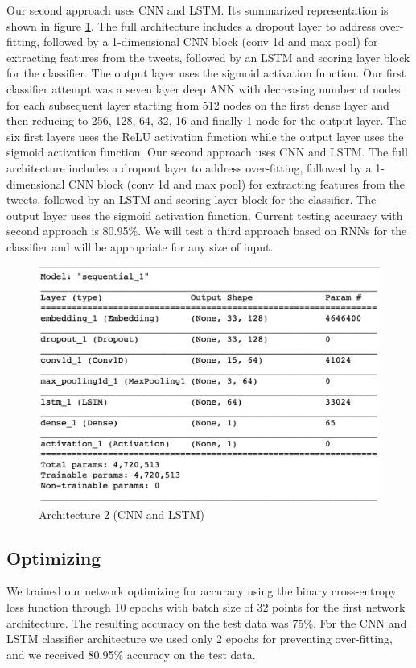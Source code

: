 \documentclass[conference]{sig-alternate-05-2015}
\begin{document}
Our second approach uses CNN and LSTM. Its summarized representation is shown in figure \ref{fig:model CNN LSTM}. The full architecture includes a dropout layer to address over-fitting, followed by a 1-dimensional CNN block (conv 1d and max pool) for extracting features from the tweets, followed by an LSTM and scoring layer block for the classifier. The output layer uses the sigmoid activation function.
Our first classifier attempt was a seven layer deep ANN with decreasing number of nodes for each subsequent layer starting from 512 nodes on the first dense layer and then reducing to 256, 128, 64, 32, 16 and finally 1 node for the output layer. The six first layers uses the ReLU activation function while the output layer uses the sigmoid activation function.
Our second approach uses CNN and LSTM. The full architecture includes a dropout layer to address over-fitting, followed by a 1-dimensional CNN block (conv 1d and max pool) for extracting features from the tweets, followed by an LSTM and scoring layer block for the classifier. The output layer uses the sigmoid activation function. Current testing accuracy with second approach is 80.95\%.
We will test a third approach based on RNNs for the classifier and will be appropriate for any size of input.
\begin{figure}
	\centering
	\includegraphics[width=0.8\linewidth]{"Model_CNN_LSTM"}
	\caption{Architecture 2 (CNN and LSTM)}
	\label{fig:model CNN LSTM}
\end{figure}

\subsection{Optimizing}
We trained our network optimizing for accuracy using the binary cross-entropy loss function through 10 epochs with batch size of 32 points for the first network architecture. The resulting accuracy on the test data was 75\%. For the CNN and LSTM classifier architecture we used only 2 epochs for preventing over-fitting, and we received 80.95\% accuracy on the test data.
\end{document}
